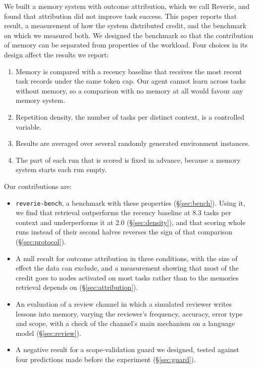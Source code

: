 \documentclass{article}
\newcommand{\bench}{\texttt{reverie-bench}}
\begin{document}
We built a memory system with outcome attribution, which we call Reverie, and found
that attribution did not improve task success. This paper reports that result, a
measurement of how the system distributed credit, and the benchmark on which we
measured both. We designed the benchmark so that the contribution of memory can be
separated from properties of the workload. Four choices in its design affect the
results we report:
\begin{enumerate}
\item Memory is compared with a recency baseline that receives the most recent task
  records under the same token cap. Our agent cannot learn across tasks without memory,
  so a comparison with no memory at all would favour any memory system.
\item Repetition density, the number of tasks per distinct context, is a controlled
  variable.
\item Results are averaged over several randomly generated environment instances.
\item The part of each run that is scored is fixed in advance, because a memory system
  starts each run empty.
\end{enumerate}

Our contributions are:
\begin{itemize}
\item \bench, a benchmark with these properties (\S\ref{sec:bench}). Using it, we find
  that retrieval outperforms the recency baseline at 8.3 tasks per context and
  underperforms it at 2.0 (\S\ref{sec:density}), and that scoring whole runs instead of
  their second halves reverses the sign of that comparison (\S\ref{sec:protocol}).
\item A null result for outcome attribution in three conditions, with the size of
  effect the data can exclude, and a measurement showing that most of the credit goes
  to nodes activated on most tasks rather than to the memories retrieval depends on
  (\S\ref{sec:attribution}).
\item An evaluation of a review channel in which a simulated reviewer writes lessons
  into memory, varying the reviewer's frequency, accuracy, error type and scope, with a
  check of the channel's main mechanism on a language model (\S\ref{sec:review}).
\item A negative result for a scope-validation guard we designed, tested against four
  predictions made before the experiment (\S\ref{sec:guard}).
\end{itemize}
\end{document}
